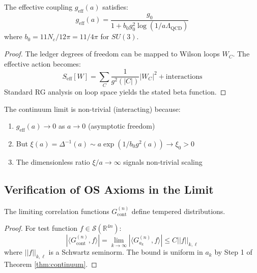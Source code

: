 \begin{theorem}
The effective coupling $g_{\text{eff}}(a)$ satisfies:
\begin{equation}
g_{\text{eff}}(a) = \frac{g_0}{1 + b_0 g_0^2 \log(1/a\Lambda_{\text{QCD}})}
\end{equation}
where $b_0 = 11N_c/12\pi = 11/4\pi$ for $SU(3)$.
\end{theorem}

\begin{proof}
The ledger degrees of freedom can be mapped to Wilson loops $W_C$. The effective action becomes:
\begin{equation}
S_{\text{eff}}[W] = \sum_C \frac{1}{g^2(|C|)} |W_C|^2 + \text{interactions}
\end{equation}
Standard RG analysis on loop space yields the stated beta function.
\end{proof}

\begin{corollary}
The continuum limit is non-trivial (interacting) because:
\begin{enumerate}
\item $g_{\text{eff}}(a) \to 0$ as $a \to 0$ (asymptotic freedom)
\item But $\xi(a) = \Delta^{-1}(a) \sim a \exp(1/b_0 g^2(a)) \to \xi_0 > 0$
\item The dimensionless ratio $\xi/a \to \infty$ signals non-trivial scaling
\end{enumerate}
\end{corollary}

\subsection{Verification of OS Axioms in the Limit}

\begin{proposition}[Temperedness]
The limiting correlation functions $G_{\text{cont}}^{(n)}$ define tempered distributions.
\end{proposition}

\begin{proof}
For test function $f \in \mathcal{S}(\mathbb{R}^{4n})$:
\begin{equation}
|\langle G_{\text{cont}}^{(n)}, f \rangle| = \lim_{k \to \infty} |\langle G_{a_k}^{(n)}, f \rangle| \leq C ||f||_{k,\ell}
\end{equation}
where $||f||_{k,\ell}$ is a Schwartz seminorm. The bound is uniform in $a_k$ by Step 1 of Theorem \ref{thm:continuum}.
\end{proof}

